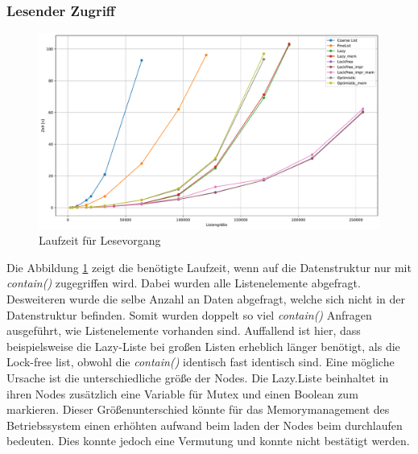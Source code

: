 \subsubsection{Lesender Zugriff}
\begin{figure}[ht!]
	\centering
	\includegraphics[width=1.0\linewidth]{./plots_pdf/check_time} 
	\caption{Laufzeit für Lesevorgang}
	\label{fig:check_time} 
\end{figure}
Die Abbildung \ref{fig:check_time} zeigt die benötigte Laufzeit, wenn auf die Datenstruktur nur mit \textit{contain()} zugegriffen wird.
Dabei wurden alle Listenelemente abgefragt. Desweiteren wurde die selbe Anzahl an Daten abgefragt, welche sich nicht in der Datenstruktur befinden.
Somit wurden doppelt so viel \textit{contain()} Anfragen ausgeführt, wie Listenelemente vorhanden sind.
Auffallend ist hier, dass beispielsweise die Lazy-Liste bei großen Listen erheblich länger benötigt, als die Lock-free list, obwohl die
\textit{contain()} identisch fast identisch sind. Eine mögliche Ursache ist die unterschiedliche größe der Nodes. Die Lazy.Liste beinhaltet
in ihren Nodes zusätzlich eine Variable für Mutex und einen Boolean zum markieren. Dieser Größenunterschied könnte für das
Memorymanagement des Betriebssystem einen erhöhten aufwand beim laden der Nodes beim durchlaufen bedeuten. Dies konnte jedoch eine Vermutung
und konnte nicht bestätigt werden.


